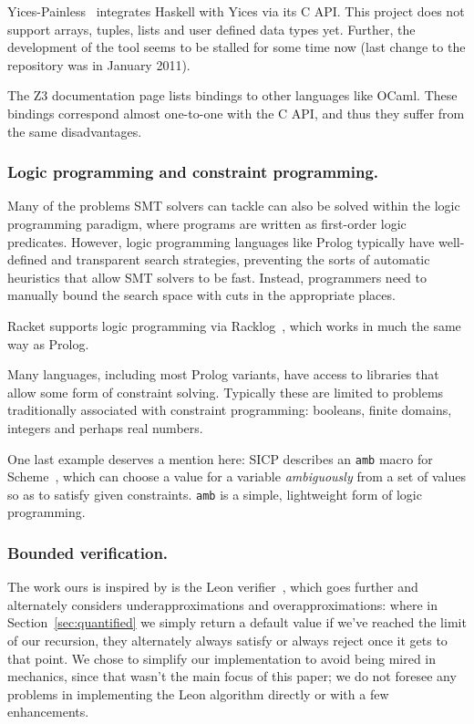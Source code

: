 Yices-Painless~\cite{yices-painless} integrates Haskell with Yices via its C
API. This project does not support arrays, tuples, lists and user defined data
types yet. Further, the development of the tool seems to be stalled for some
time now (last change to the repository was in January 2011).

The Z3 documentation page lists bindings to other languages like OCaml. These
bindings correspond almost one-to-one with the C API, and thus they suffer
from the same disadvantages.

\subsubsection{Logic programming and constraint programming.}

Many of the problems SMT solvers can tackle can also be solved within the
logic programming paradigm, where programs are written as first-order logic
predicates. However, logic programming languages like Prolog typically have
well-defined and transparent search strategies, preventing the sorts of
automatic heuristics that allow SMT solvers to be fast. Instead, programmers
need to manually bound the search space with cuts in the appropriate places.

Racket supports logic programming via Racklog~\cite{racklog}, which works in
much the same way as Prolog.

Many languages, including most Prolog variants, have access to libraries that
allow some form of constraint solving. Typically these are limited to problems
traditionally associated with constraint programming: booleans, finite
domains, integers and perhaps real numbers.

One last example deserves a mention here: SICP describes an \texttt{amb} macro
for Scheme~\cite[Section~4.3]{sicp}, which can choose a value for a variable
\textit{ambiguously} from a set of values so as to satisfy given constraints.
\texttt{amb} is a simple, lightweight form of logic programming.

\subsubsection{Bounded verification.}

The work ours is inspired by is the Leon verifier~\cite{sat-recursive}, which
goes further and alternately considers underapproximations and
overapproximations: where in Section~\ref{sec:quantified} we simply return a
default value if we've reached the limit of our recursion, they alternately
always satisfy or always reject once it gets to that point. We chose to
simplify our implementation to avoid being mired in mechanics, since that
wasn't the main focus of this paper; we do not foresee any problems in
implementing the Leon algorithm directly or with a few enhancements.
